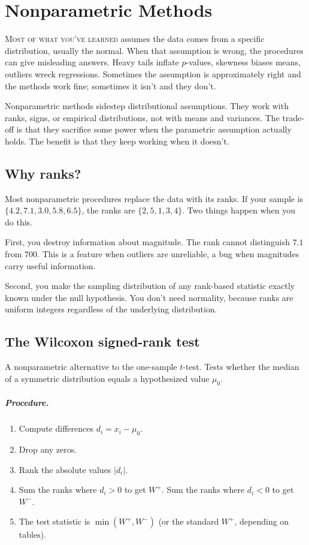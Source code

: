 \chapter{Nonparametric Methods}
\label{ch:nonparametric}

\noindent\textsc{Most of what you've learned} assumes the data comes from a specific distribution, usually the normal. When that assumption is wrong, the procedures can give misleading answers. Heavy tails inflate $p$-values, skewness biases means, outliers wreck regressions. Sometimes the assumption is approximately right and the methods work fine; sometimes it isn't and they don't.

Nonparametric methods sidestep distributional assumptions. They work with ranks, signs, or empirical distributions, not with means and variances. The trade-off is that they sacrifice some power when the parametric assumption actually holds. The benefit is that they keep working when it doesn't.

\section{Why ranks?}

Most nonparametric procedures replace the data with its ranks. If your sample is $\{4.2, 7.1, 3.0, 5.8, 6.5\}$, the ranks are $\{2, 5, 1, 3, 4\}$. Two things happen when you do this.

First, you destroy information about magnitude. The rank cannot distinguish $7.1$ from $700$. This is a feature when outliers are unreliable, a bug when magnitudes carry useful information.

Second, you make the sampling distribution of any rank-based statistic exactly known under the null hypothesis. You don't need normality, because ranks are uniform integers regardless of the underlying distribution.

\section{The Wilcoxon signed-rank test}

A nonparametric alternative to the one-sample $t$-test. Tests whether the median of a symmetric distribution equals a hypothesized value $\mu_0$.

\paragraph{Procedure.}
\begin{enumerate}[noitemsep]
  \item Compute differences $d_i = x_i - \mu_0$.
  \item Drop any zeros.
  \item Rank the absolute values $|d_i|$.
  \item Sum the ranks where $d_i > 0$ to get $W^+$. Sum the ranks where $d_i < 0$ to get $W^-$.
  \item The test statistic is $\min(W^+, W^-)$ (or the standard $W^+$, depending on tables).
\end{enumerate}

